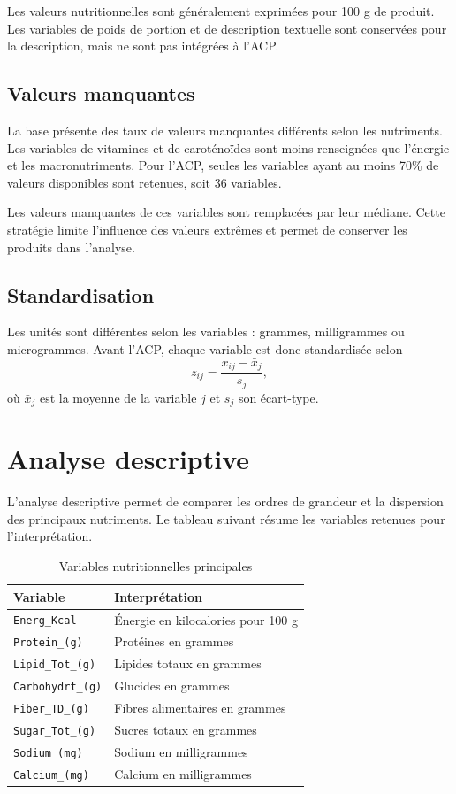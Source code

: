 \documentclass[12pt,a4paper]{article}
\begin{document}
Les valeurs nutritionnelles sont généralement exprimées pour 100 g de produit. Les variables de poids de portion et de description textuelle sont conservées pour la description, mais ne sont pas intégrées à l'ACP.

\subsection{Valeurs manquantes}

La base présente des taux de valeurs manquantes différents selon les nutriments. Les variables de vitamines et de caroténoïdes sont moins renseignées que l'énergie et les macronutriments. Pour l'ACP, seules les variables ayant au moins 70\% de valeurs disponibles sont retenues, soit 36 variables.

Les valeurs manquantes de ces variables sont remplacées par leur médiane. Cette stratégie limite l'influence des valeurs extrêmes et permet de conserver les produits dans l'analyse.

\subsection{Standardisation}

Les unités sont différentes selon les variables : grammes, milligrammes ou microgrammes. Avant l'ACP, chaque variable est donc standardisée selon
\[
    z_{ij}=\frac{x_{ij}-\bar{x}_{j}}{s_j},
\]
où $\bar{x}_{j}$ est la moyenne de la variable $j$ et $s_j$ son écart-type.

\section{Analyse descriptive}

L'analyse descriptive permet de comparer les ordres de grandeur et la dispersion des principaux nutriments. Le tableau suivant résume les variables retenues pour l'interprétation.

\begin{table}[H]
\centering
\caption{Variables nutritionnelles principales}
\label{tab:descriptif}
\begin{tabular}{>{\raggedright\arraybackslash}p{4.2cm}p{7.5cm}}
\toprule
Variable & Interprétation \\
\midrule
\texttt{Energ\_Kcal} & Énergie en kilocalories pour 100 g \\
\texttt{Protein\_(g)} & Protéines en grammes \\
\texttt{Lipid\_Tot\_(g)} & Lipides totaux en grammes \\
\texttt{Carbohydrt\_(g)} & Glucides en grammes \\
\texttt{Fiber\_TD\_(g)} & Fibres alimentaires en grammes \\
\texttt{Sugar\_Tot\_(g)} & Sucres totaux en grammes \\
\texttt{Sodium\_(mg)} & Sodium en milligrammes \\
\texttt{Calcium\_(mg)} & Calcium en milligrammes \\
\bottomrule
\end{tabular}
\end{table}
\end{document}
